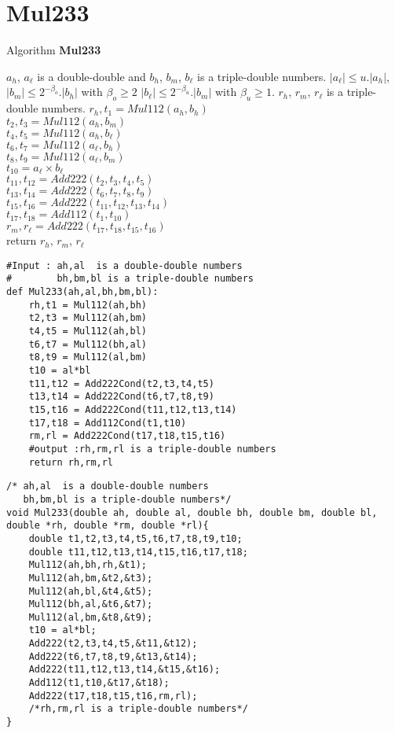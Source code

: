 \section*{Mul233}
\begin{algorithm}[htbp]
  \caption{Algorithm \textbf{Mul233}}
\begin{algorithmic}[1]
\Input $a_h$, $a_{\ell}$  is a double-double and $b_h$, $b_m$, $b_{\ell}$ is a triple-double numbers.
\Condition $\lvert a_{\ell} \rvert \le u. \lvert a_h \rvert $, 
\Condition $\lvert b_m \rvert \le 2^{-\beta_o}. \lvert b_h \rvert $ with $\beta_o \ge 2$
\Condition $\lvert b_{\ell} \rvert \le 2^{-\beta_u}. \lvert b_m \rvert $  with $\beta_u \ge 1$.
\Output $r_h$, $r_m$, $r_{\ell}$ is a triple-double numbers.
\State $r_h,t_1 = Mul112(a_h,b_h)$\\
    $t_2,t_3 = Mul112(a_h,b_m)$\\
    $t_4,t_5 = Mul112(a_h,b_{\ell})$\\
    $t_6,t_7 = Mul112(a_{\ell},b_h)$\\
    $t_8,t_9 = Mul112(a_{\ell},b_m)$\\
    $t_{10} = a_{\ell}\times b_{\ell}$\\
    $t_{11},t_{12} = Add222(t_2,t_3,t_4,t_5)$\\
    $t_{13},t_{14} = Add222(t_6,t_7,t_8,t_9)$\\
    $t_{15},t_{16} = Add222(t_{11},t_{12},t_{13},t_{14})$\\
    $t_{17},t_{18} = Add112(t_1,t_{10})$\\
    $r_m,r_{\ell} = Add222(t_{17},t_{18},t_{15},t_{16})$\\
    return $r_h$, $r_m$, $r_{\ell}$
\end{algorithmic}
\label{algo:Mul233}
\end{algorithm}

\begin{lstlisting}
#Input : ah,al  is a double-double numbers
#        bh,bm,bl is a triple-double numbers
def Mul233(ah,al,bh,bm,bl):
    rh,t1 = Mul112(ah,bh)
    t2,t3 = Mul112(ah,bm)
    t4,t5 = Mul112(ah,bl)
    t6,t7 = Mul112(bh,al)
    t8,t9 = Mul112(al,bm)
    t10 = al*bl
    t11,t12 = Add222Cond(t2,t3,t4,t5)
    t13,t14 = Add222Cond(t6,t7,t8,t9)
    t15,t16 = Add222Cond(t11,t12,t13,t14)
    t17,t18 = Add112Cond(t1,t10)
    rm,rl = Add222Cond(t17,t18,t15,t16)
    #output :rh,rm,rl is a triple-double numbers
    return rh,rm,rl
\end{lstlisting}

\begin{lstlisting}
/* ah,al  is a double-double numbers
   bh,bm,bl is a triple-double numbers*/
void Mul233(double ah, double al, double bh, double bm, double bl, double *rh, double *rm, double *rl){
    double t1,t2,t3,t4,t5,t6,t7,t8,t9,t10;
    double t11,t12,t13,t14,t15,t16,t17,t18;
    Mul112(ah,bh,rh,&t1);
    Mul112(ah,bm,&t2,&t3);
    Mul112(ah,bl,&t4,&t5);
    Mul112(bh,al,&t6,&t7);
    Mul112(al,bm,&t8,&t9);
    t10 = al*bl;
    Add222(t2,t3,t4,t5,&t11,&t12);
    Add222(t6,t7,t8,t9,&t13,&t14);
    Add222(t11,t12,t13,t14,&t15,&t16);
    Add112(t1,t10,&t17,&t18);
    Add222(t17,t18,t15,t16,rm,rl); 
    /*rh,rm,rl is a triple-double numbers*/
}
\end{lstlisting}
\newpage

